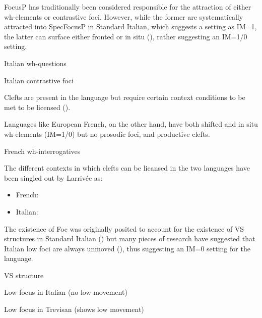 \documentclass[fleqn,10pt]{wlscirep}
\begin{document}
FocusP has traditionally been considered responsible for the attraction of either wh-elements or contrastive foci. 
However, while the former are systematically attracted into SpecFocusP in Standard Italian, which suggests a setting as IM=1, the latter can surface either fronted or in situ (\citealt{bianchi2013}), rather suggesting an IM=1/0 setting. 

\begin{exe}
    \ex Italian wh-questions
\end{exe}

\begin{exe}
    \ex Italian contrastive foci
\end{exe}

Clefts are present in the language but require certain context conditions to be met to be licensed (\citealt{larrive2022}). 

Languages like European French, on the other hand, have both shifted and in situ wh-elements (IM=1/0) but no prosodic foci, and productive clefts. 

\begin{exe}
    \ex French wh-interrogatives
\end{exe}

The different contexts in which clefts can be licansed in the two languages have been singled out by Larrivée as:
\begin{itemize}
    \item French:
    \item \vspace*{-2mm} Italian:
\end{itemize}

The existence of Foc was originally posited to account for the existence of VS structures in Standard Italian (\citealt{belletti2004}) but many pieces of research have suggested that Italian low foci are always unmoved (\citealt{cardinaletti2001,sameklodovici15,bonan21}), thus suggesting an IM=0 setting for the language. 

\begin{exe}
    \ex VS structure
\end{exe}

\begin{exe}
    \ex Low focus in Italian (no low movement)
\end{exe}

\begin{exe}
    \ex Low focus in Trevisan (shows low movement)
\end{exe}
\end{document}
